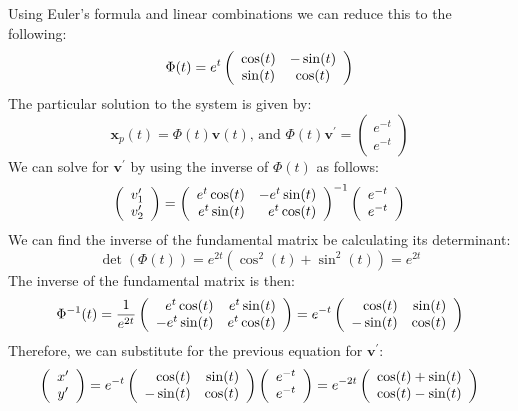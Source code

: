 \documentclass[12pt,letterpaper,reqno]{amsart}
\begin{document}
\begin{enumerate}
\begin{enumerate}
\begin{flushleft}
    Using Euler's formula and linear combinations we can reduce this to the following:
    $$\Phi(t) = e^t \left( \begin{array} { c c } { \cos(t) }  & { -\sin(t) } \\ { \sin(t) } & { \cos(t) } \end{array} \right)$$
    The particular solution to the system is given by:
    $$\mathbf { x } _ { p } ( t ) = \Phi ( t ) \mathbf { v } ( t ) \text{, and }\Phi ( t ) \mathbf { v } ^ { \prime } = \left( \begin{array} { c } { e ^ { -t } } \\ { e ^ { -t } } \end{array} \right)$$
    We can solve for $\mathbf{v}^\prime$ by using the inverse of $\Phi(t)$ as follows:
    $$\left( \begin{array} { c } { v _ { 1 } ^ { \prime } } \\ { v _ { 2 } ^ { \prime } } \end{array} \right) = \left( \begin{array} { r r } { e^t\cos(t) }  & { -e^t\sin(t) } \\ { e^t\sin(t) } & { e^t\cos(t) } \end{array} \right) ^ { - 1 } \left( \begin{array} { c } { e ^ { -t } } \\ { e ^ { -t } } \end{array} \right)$$
    We can find the inverse of the fundamental matrix be calculating its determinant:
    $$\det(\Phi(t)) = e^{2t}(\cos^2(t) + \sin^2(t)) = e^{2t}$$
    The inverse of the fundamental matrix is then:
    $$\Phi^{-1}(t) = \frac{1}{e^{2t}} \left( \begin{array} { r r } { e^t\cos(t) }  & { e^t\sin(t) } \\ { -e^t\sin(t) } & { e^t\cos(t) } \end{array} \right) = e^{-t} \left( \begin{array} { r r } { \cos(t) }  & { \sin(t) } \\ { -\sin(t) } & { \cos(t) } \end{array} \right)$$
    Therefore, we can substitute for the previous equation for $\mathbf{v}^\prime$:
    $$\left( \begin{array} { c } { x ^ { \prime } } \\ { y ^ { \prime } } \end{array} \right) =  e^{-t} \left( \begin{array} { r r } { \cos(t) }  & { \sin(t) } \\ { -\sin(t) } & { \cos(t) } \end{array} \right) \left( \begin{array} { c } { e ^ { -t } } \\ { e ^ { -t } } \end{array} \right) = e^{-2t}\left( \begin{array} { r } { \cos(t) + \sin(t) } \\ { \cos(t) - \sin(t) } \end{array} \right)$$

\end{flushleft}
\end{enumerate}
\end{enumerate}
\end{document}

